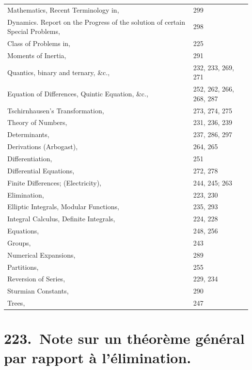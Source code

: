 \documentclass[11pt,a4paper]{book}
\begin{document}
\begin{tabular}{@{}p{2.5in}l@{}}
Mathematics, Recent Terminology in, & 299 \\
Dynamics. Report on the Progress of the solution of certain Special Problems, & 298 \\
\quad Class of Problems in, & 225 \\
\quad Moments of Inertia, & 291 \\
Quantics, binary and ternary, \&c., & 232, 233, 269, 271 \\
Equation of Differences, Quintic Equation, \&c., & 252, 262, 266, 268, 287 \\
Tschirnhausen's Transformation, & 273, 274, 275 \\
Theory of Numbers, & 231, 236, 239 \\
Determinants, & 237, 286, 297 \\
Derivations (Arbogast), & 264, 265 \\
Differentiation, & 251 \\
Differential Equations, & 272, 278 \\
Finite Differences; (Electricity), & 244, 245; 263 \\
Elimination, & 223, 230 \\
Elliptic Integrals, Modular Functions, & 235, 293 \\
Integral Calculus, Definite Integrals, & 224, 228 \\
Equations, & 248, 256 \\
Groups, & 243 \\
Numerical Expansions, & 289 \\
Partitions, & 255 \\
Reversion of Series, & 229, 234 \\
Sturmian Constants, & 290 \\
Trees, & 247 \\
\end{tabular}
\newpage

\mainmatter

\chapter[Note sur un th\'{e}or\`{e}me g\'{e}n\'{e}ral par rapport \`{a} l'\'{e}limination]{223.\ Note sur un th\'{e}or\`{e}me g\'{e}n\'{e}ral par rapport \`{a} l'\'{e}limination.}
\label{paper223}
\end{document}
